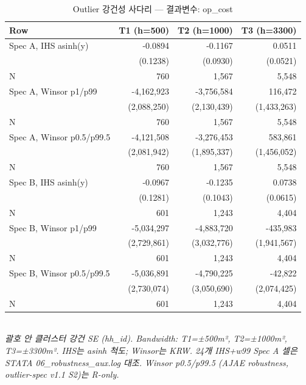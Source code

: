 \begin{table}[t]
\centering
\caption{Outlier 강건성 사다리 — 결과변수: op_cost}
\label{tab:rob_outlier_op_cost_ko}
\begin{tabular}{lrrr}
\toprule
Row & T1 (h=500) & T2 (h=1000) & T3 (h=3300) \\
\midrule
Spec A, IHS asinh(y) & -0.0894 & -0.1167 & 0.0511 \\
        & (0.1238) & (0.0930) & (0.0521) \\
N       & 760 & 1,567 & 5,548 \\
Spec A, Winsor p1/p99 & -4,162,923 & -3,756,584 & 116,472 \\
        & (2,088,250) & (2,130,439) & (1,433,263) \\
N       & 760 & 1,567 & 5,548 \\
Spec A, Winsor p0.5/p99.5 & -4,121,508 & -3,276,453 & 583,861 \\
        & (2,081,942) & (1,895,337) & (1,456,052) \\
N       & 760 & 1,567 & 5,548 \\
Spec B, IHS asinh(y) & -0.0967 & -0.1235 & 0.0738 \\
        & (0.1281) & (0.1043) & (0.0615) \\
N       & 601 & 1,243 & 4,404 \\
Spec B, Winsor p1/p99 & -5,034,297 & -4,883,720 & -435,983 \\
        & (2,729,861) & (3,032,776) & (1,941,567) \\
N       & 601 & 1,243 & 4,404 \\
Spec B, Winsor p0.5/p99.5 & -5,036,891 & -4,790,225 & -42,822 \\
        & (2,730,074) & (3,050,690) & (2,074,425) \\
N       & 601 & 1,243 & 4,404 \\
\bottomrule
\end{tabular}
\\
\footnotesize\textit{괄호 안 클러스터 강건 SE (hh_id). Bandwidth: T1=±500m², T2=±1000m², T3=±3300m². IHS는 asinh 척도; Winsor는 KRW. 24개 IHS+w99 Spec A 셀은 STATA 06_robustness_aux.log 대조. Winsor p0.5/p99.5 (AJAE robustness, outlier-spec v1.1 S2)는 R-only.}
\end{table}


